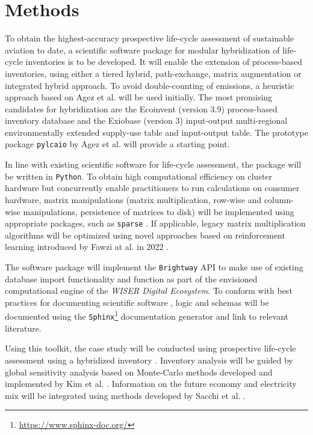 \documentclass{article}
\begin{document}
\section{Methods}

    To obtain the highest-accuracy prospective life-cycle assessment of sustainable aviation to date, a scientific software package for modular hybridization of life-cycle inventories is to be developed. It will enable the extension of process-based inventories, using either a tiered hybrid, path-exchange, matrix augmentation or integrated hybrid \cite{hauschild_life_2015}\cite{hauschild_life_2018}\cite{crawford_hybrid_2018} approach. To avoid double-counting of emissions, a heuristic approach based on Agez et al. \cite{agez_lifting_2019}\cite{agez_correcting_2022}\cite{agez_hybridization_2020} will be used initially. The most promising candidates for hybridization are the Ecoinvent (version 3.9) process-based inventory database and the Exiobase (version 3) input-output multi-regional environmentally extended supply-use  table and input-output table. The prototype package \texttt{pylcaio} by Agez et al. \cite{noauthor_pylcaio_2022} will provide a starting point.
    
    In line with existing scientific software for life-cycle assessment, the package will be written in \texttt{Python}. To obtain high computational efficiency on cluster hardware but concurrently enable practitioners to run calculations on consumer hardware, matrix manipulations (matrix multiplication, row-wise and column-wise manipulations, persistence of matrices to disk) will be implemented using appropriate packages, such as \texttt{sparse} \cite{abbasi_sparse_2018}. If applicable, legacy matrix multiplication algorithms will be optimized using novel approaches based on reinforcement learning introduced by Fawzi at al. in 2022 \cite{fawzi_discovering_2022}.
    
    The software package will implement the \texttt{Brightway} API to make use of existing database import functionality and function as part of the envisioned computational engine of the \textit{WISER Digital Ecosystem}. To conform with best practices for documenting scientific software \cite{lee_ten_2018}, logic and schemas will be documented using the \texttt{Sphinx}\footnote{\url{https://www.sphinx-doc.org/}} documentation generator and link to relevant literature.
    
    Using this toolkit, the case study will be conducted using prospective \cite{sacchi_prospective_2022} life-cycle assessment using a hybridized inventory \cite{crawford_hybrid_2018}. Inventory analysis will be guided by global sensitivity analysis based on Monte-Carlo methods developed and implemented by Kim et al. \cite{kim_global_2022}. Information on the future economy and electricity mix will be integrated using methods developed by Sacchi et al. \cite{sacchi_prospective_2022}.
    
\end{document}
